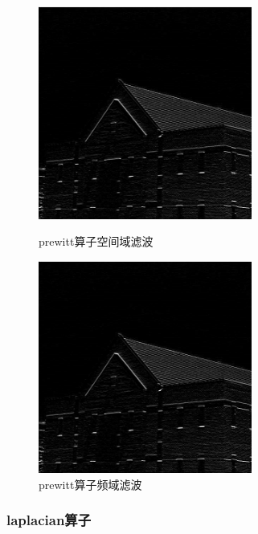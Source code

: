 \documentclass[11pt, a4paper, UTF8]{ctexart}
\begin{document}
  \begin{figure}[H]
    \centering
    \begin{minipage}[t]{0.48\textwidth}
    \centering
    \includegraphics[width=7cm]{prewitt_space.jpg}
    \caption{prewitt算子空间域滤波}
    \end{minipage}
    \begin{minipage}[t]{0.48\textwidth}
    \centering
    \includegraphics[width=7cm]{prewitt_freq.jpg}
    \caption{prewitt算子频域滤波}
    \end{minipage}
  \end{figure}

  \subsubsection{laplacian算子}
\end{document}
